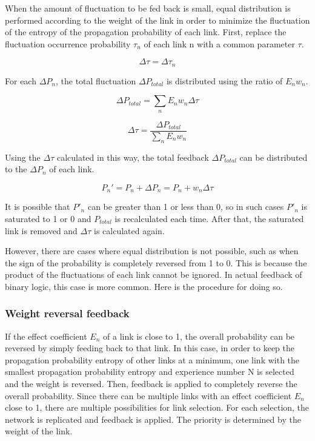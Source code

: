 \documentclass[12pt]{article}
\begin{document}
When the amount of fluctuation to be fed back is small, equal
distribution is performed according to the weight of the link in order
to minimize the fluctuation of the entropy of the propagation
probability of each link. First, replace the fluctuation occurrence
probability \(\tau_n\) of each link n with a common parameter \(\tau\).

\[\Delta \tau = \Delta \tau_n\]

For each \(\Delta P_n\), the total fluctuation \(\Delta P_{total}\) is
distributed using the ratio of \(E_nw_n\).

\[\Delta P_{total} = \sum_n E_n w_n\Delta \tau\]

\[\Delta \tau = \frac{\Delta P_{total}}{ \sum_n E_n w_n} \]

Using the \(\Delta \tau\) calculated in this way, the total feedback
\(\Delta P_{total}\) can be distributed to the \(\Delta P_n\) of each
link.

\[ P_n' =P_n+\Delta P_n =P_n+w_n \Delta \tau\]

It is possible that \(P'_n\) can be greater than 1 or less than 0, so in
such cases \(P'_n\) is saturated to 1 or 0 and \(P_{total}\) is
recalculated each time. After that, the saturated link is removed and
\(\Delta \tau\) is calculated again.

However, there are cases where equal distribution is not possible, such
as when the sign of the probability is completely reversed from 1 to 0.
This is because the product of the fluctuations of each link cannot be
ignored. In actual feedback of binary logic, this case is more common.
Here is the procedure for doing so.

\subsubsection{Weight reversal feedback}\label{weight-reversal-feedback}

If the effect coefficient \(E_n\) of a link is close to 1, the overall
probability can be reversed by simply feeding back to that link. In this
case, in order to keep the propagation probability entropy of other
links at a minimum, one link with the smallest propagation probability
entropy and experience number N is selected and the weight is reversed.
Then, feedback is applied to completely reverse the overall probability.
Since there can be multiple links with an effect coefficient \(E_n\)
close to 1, there are multiple possibilities for link selection. For
each selection, the network is replicated and feedback is applied. The
priority is determined by the weight of the link. 
\end{document}
